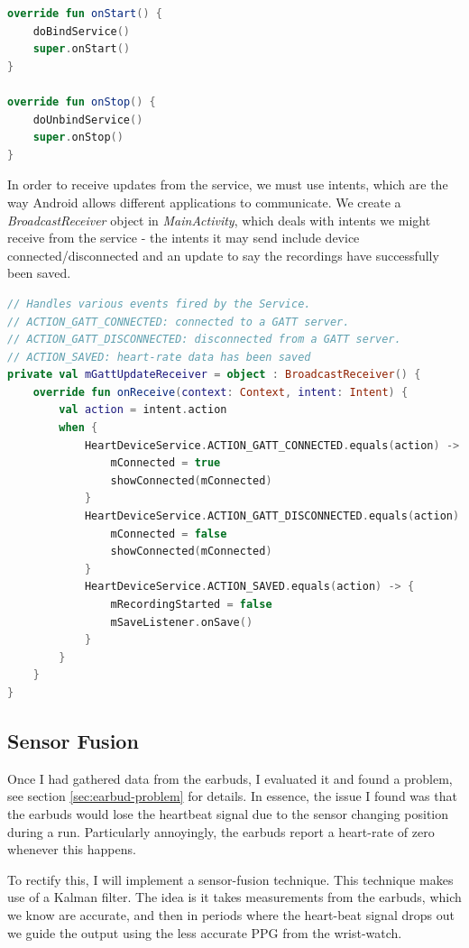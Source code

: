 \documentclass[12pt,a4paper,twoside,openright]{report}
\begin{document}
\begin{lstlisting}[language=Kotlin]
override fun onStart() {
    doBindService()
    super.onStart()
}

override fun onStop() {
    doUnbindService()
    super.onStop()
}
\end{lstlisting}

In order to receive updates from the service, we must use intents, which are
the way Android allows different applications to communicate. 
We create a \emph{BroadcastReceiver}
object in \emph{MainActivity}, which deals with intents we might receive from
the service - the intents it may send include device connected/disconnected
and an update to say the recordings have successfully been saved. 

\begin{lstlisting}[language=Kotlin]
// Handles various events fired by the Service.
// ACTION_GATT_CONNECTED: connected to a GATT server.
// ACTION_GATT_DISCONNECTED: disconnected from a GATT server.
// ACTION_SAVED: heart-rate data has been saved
private val mGattUpdateReceiver = object : BroadcastReceiver() {
    override fun onReceive(context: Context, intent: Intent) {
        val action = intent.action
        when {
            HeartDeviceService.ACTION_GATT_CONNECTED.equals(action) -> {
                mConnected = true
                showConnected(mConnected)
            }
            HeartDeviceService.ACTION_GATT_DISCONNECTED.equals(action) -> {
                mConnected = false
                showConnected(mConnected)
            }
            HeartDeviceService.ACTION_SAVED.equals(action) -> {
                mRecordingStarted = false
                mSaveListener.onSave()
            }
        }
    }
}
\end{lstlisting}


\subsection{Sensor Fusion}

Once I had gathered data from the earbuds, I evaluated it and found a problem,
see section \ref{sec:earbud-problem} for details. In essence, the issue I
found was that the earbuds would lose the heartbeat signal due to the sensor
changing position during a run. Particularly annoyingly, the earbuds report a
heart-rate of zero whenever this happens. 

To rectify this, I will implement a sensor-fusion technique. This technique
makes use of a Kalman filter. The idea is it takes measurements from the earbuds, which
we know are accurate, and then in periods where the heart-beat signal drops
out we guide the output using the less accurate PPG from the wrist-watch.
\end{document}
